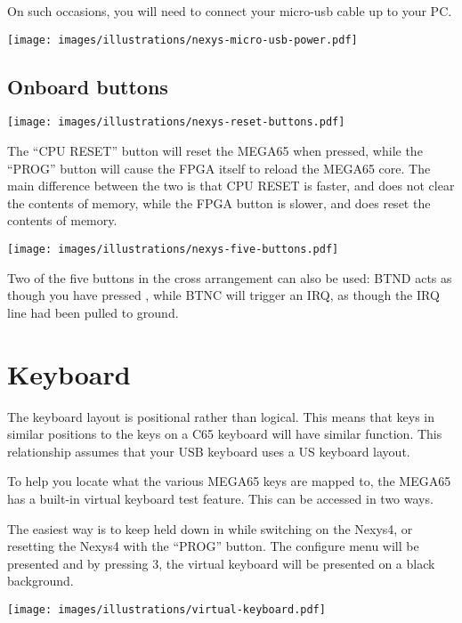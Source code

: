 On such occasions, you will need to connect your micro-usb cable up to your PC.

\texttt{[image: images/illustrations/nexys-micro-usb-power.pdf]}

\subsection{Onboard buttons}

\begin{center}
  \texttt{[image: images/illustrations/nexys-reset-buttons.pdf]}
\end{center}

The ``CPU RESET'' button will reset the MEGA65 when pressed, while the ``PROG'' button will cause the FPGA itself to reload the MEGA65
core.  The main difference between the two is that CPU RESET is faster, and does not clear the contents of memory, while the FPGA button
is slower, and does reset the contents of memory.

\begin{center}
  \texttt{[image: images/illustrations/nexys-five-buttons.pdf]}
\end{center}

Two of the five buttons in the cross arrangement can also be used:  BTND acts as though you have pressed , while BTNC will trigger an IRQ, as though the IRQ line had been pulled to ground.

\section{Keyboard}

The keyboard layout is positional rather than logical.
This means that keys in similar positions to the keys on a C65 keyboard will have similar function.
This relationship assumes that your USB keyboard uses a US keyboard layout.

To help you locate what the various MEGA65 keys are mapped to, the MEGA65 has a built-in virtual keyboard test feature. This can be accessed in two ways.

The easiest way is to keep  held down in while switching on the Nexys4, or resetting the Nexys4 with
the ``PROG'' button. The configure menu will be presented and by pressing 3, the virtual keyboard will be presented on a black background.

\texttt{[image: images/illustrations/virtual-keyboard.pdf]}

